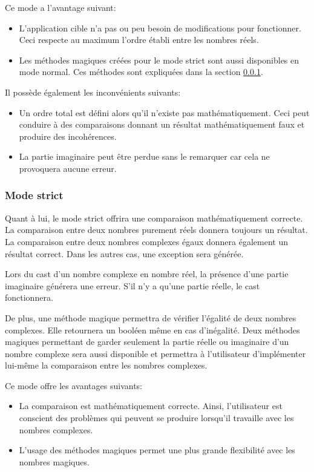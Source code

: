 Ce mode a l'avantage suivant:
\begin{itemize}
    \item L'application cible n'a pas ou peu besoin de modifications pour fonctionner. Ceci respecte au maximum l'ordre établi entre les nombres réels.
    \item Les méthodes magiques créées pour le mode strict sont aussi disponibles en mode normal. Ces méthodes sont expliquées dans la section \ref{sec:complex_design_modes_strict}.
\end{itemize}

Il possède également les inconvénients suivants:
\begin{itemize}
    \item Un ordre total est défini alors qu'il n'existe pas mathématiquement. Ceci peut conduire à des comparaisons donnant un résultat mathématiquement faux et produire des incohérences.
    \item La partie imaginaire peut être perdue sans le remarquer car cela ne provoquera aucune erreur.
\end{itemize}

\subsubsection{Mode strict}
\label{sec:complex_design_modes_strict}

Quant à lui, le mode strict offrira une comparaison mathématiquement correcte. La comparaison entre deux nombres purement réels donnera toujours un résultat. La comparaison entre deux nombres complexes égaux donnera également un résultat correct. Dans les autres cas, une exception sera générée.

Lors du cast d'un nombre complexe en nombre réel, la présence d'une partie imaginaire générera une erreur. S'il n'y a qu'une partie réelle, le cast fonctionnera.

De plus, une méthode magique permettra de vérifier l'égalité de deux nombres complexes. Elle retournera un booléen même en cas d'inégalité. Deux méthodes magiques permettant de garder seulement la partie réelle ou imaginaire d'un nombre complexe sera aussi disponible et permettra à l'utilisateur d'implémenter lui-même la comparaison entre les nombres complexes.

Ce mode offre les avantages suivants:
\begin{itemize}
    \item La comparaison est mathématiquement correcte. Ainsi, l'utilisateur est conscient des problèmes qui peuvent se produire lorsqu'il travaille avec les nombres complexes.
    \item L'usage des méthodes magiques permet une plus grande flexibilité avec les nombres magiques.
\end{itemize}

